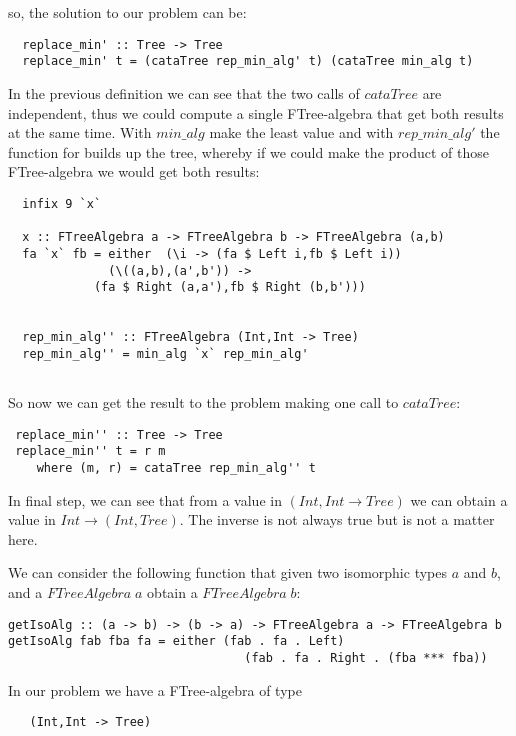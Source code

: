 \documentclass[a4paper,10pt]{article}
\begin{document}
\noindent so, the solution to our problem can be:

\begin{lstlisting}
  replace_min' :: Tree -> Tree
  replace_min' t = (cataTree rep_min_alg' t) (cataTree min_alg t) 
\end{lstlisting}

In the previous definition we can see that the two calls of $cataTree$ are independent, thus
we could compute a single FTree-algebra that get both results at the same time. With $min\_alg$
make the least value and with $rep\_min\_alg'$ the function for builds up the tree, whereby if
we could make the product of those FTree-algebra we would get both results:

\begin{lstlisting}
  infix 9 `x`

  x :: FTreeAlgebra a -> FTreeAlgebra b -> FTreeAlgebra (a,b)
  fa `x` fb = either  (\i -> (fa $ Left i,fb $ Left i))
		      (\((a,b),(a',b')) -> 
			(fa $ Right (a,a'),fb $ Right (b,b')))
			  

  rep_min_alg'' :: FTreeAlgebra (Int,Int -> Tree)
  rep_min_alg'' = min_alg `x` rep_min_alg'
  
\end{lstlisting}

So now we can get the result to the problem making one call to $cataTree$:

\begin{lstlisting}
 replace_min'' :: Tree -> Tree
 replace_min'' t = r m
    where (m, r) = cataTree rep_min_alg'' t
\end{lstlisting}

In final step, we can see that from a value in $(Int,Int \rightarrow Tree)$ we can
obtain a value in $Int \rightarrow (Int,Tree)$. The inverse is not always true but 
is not a matter here.

We can consider the following function that given two isomorphic types
$a$ and $b$, and a $FTreeAlgebra\;a$ obtain a $FTreeAlgebra\;b$:

\begin{lstlisting}
getIsoAlg :: (a -> b) -> (b -> a) -> FTreeAlgebra a -> FTreeAlgebra b
getIsoAlg fab fba fa = either (fab . fa . Left)
                                 (fab . fa . Right . (fba *** fba))
\end{lstlisting}
\medskip

In our problem we have a FTree-algebra of type
  
\begin{lstlisting}
   (Int,Int -> Tree)
\end{lstlisting}
\end{document}
